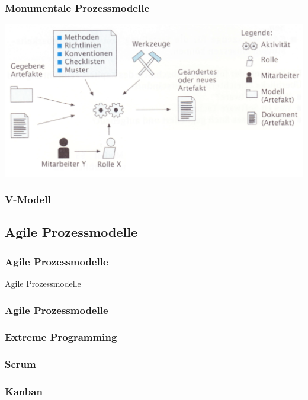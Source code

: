 \begin{frame}
\frametitle{Monumentale Prozessmodelle}
	\center\includegraphics[width=1\textwidth,
			keepaspectratio=true]{bilder/prozessmodell.png}
\end{frame}

\begin{frame}
\frametitle{V-Modell}
	
\end{frame}

\subsection{Agile Prozessmodelle}
\begin{frame}
\frametitle{Agile Prozessmodelle}
\huge Agile Prozessmodelle
\end{frame}

\begin{frame}
\frametitle{Agile Prozessmodelle}

\end{frame}

\begin{frame}
\frametitle{Extreme Programming}
	
\end{frame}

\begin{frame}
\frametitle{Scrum}
	
\end{frame}

\begin{frame}
\frametitle{Kanban}
	
\end{frame}